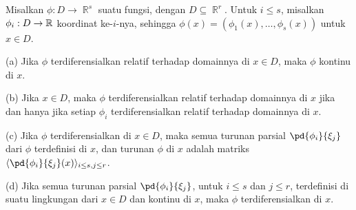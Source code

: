  Misalkan $\phi:D\to\BbbR^s$ suatu fungsi, dengan
$D\subseteq\BbbR^r$.   Untuk $i\le s$, misalkan $\phi_i:D\to\Bbb R$
koordinat ke-$i$-nya, sehingga $\phi(x)=(\phi_1(x),\ldots,\phi_s(x))$
untuk $x\in D$.

(a) Jika $\phi$ terdiferensialkan relatif terhadap domainnya di $x\in D$,
maka $\phi$ kontinu di $x$.

(b) Jika $x\in D$, maka $\phi$ terdiferensialkan relatif terhadap
domainnya di $x$ jika dan hanya jika setiap $\phi_i$ terdiferensialkan
relatif terhadap domainnya di $x$.

(c) Jika $\phi$ terdiferensialkan di $x\in D$, maka semua turunan parsial
$\pd{\phi_i}{\xi_j}$ dari $\phi$ terdefinisi di $x$, dan turunan $\phi$
di $x$ adalah matriks
$\langle\pd{\phi_i}{\xi_j}(x)\rangle_{i\le s,j\le r}$.

(d) Jika semua turunan parsial $\pd{\phi_i}{\xi_j}$, untuk $i\le s$ dan
$j\le r$, terdefinisi di suatu lingkungan dari $x\in D$ dan kontinu di $x$,
maka $\phi$ terdiferensialkan di $x$.


